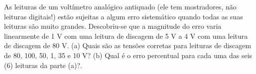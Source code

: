 As leituras de um voltímetro analógico antiquado (ele tem mostradores, não leituras digitais!) estão sujeitas a algum erro sistemático quando todas as suas leituras são muito grandes. Descobriu-se que a magnitude do erro varia linearmente de 1 V com uma leitura de discagem de 5 V a 4 V com uma leitura de discagem de 80 V. (a) Quais são as tensões corretas para leituras de discagem de 80, 100, 50, 1, 35 e 10 V? (b) Qual é o erro percentual para cada uma das seis (6) leituras da parte (a)?.


